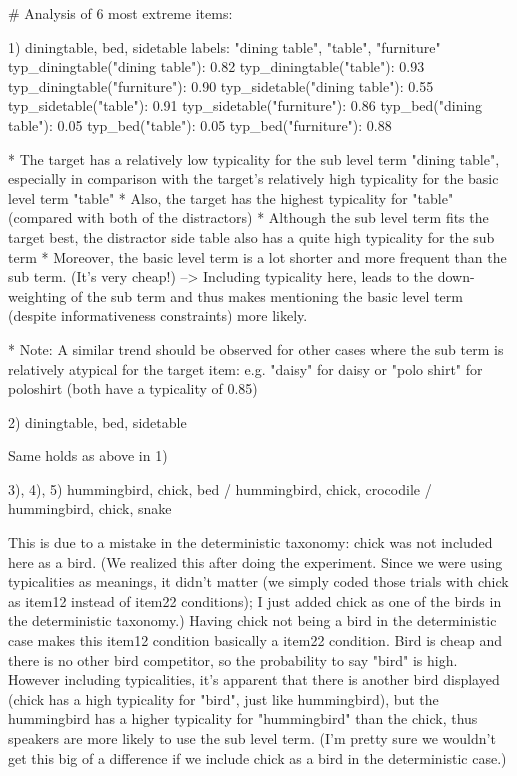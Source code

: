 # Analysis of 6 most extreme items:

1) diningtable, bed, sidetable
	labels: "dining table", "table", "furniture"
	typ_diningtable("dining table"): 0.82
	typ_diningtable("table"): 0.93
	typ_diningtable("furniture"): 0.90
	typ_sidetable("dining table"): 0.55
	typ_sidetable("table"): 0.91
	typ_sidetable("furniture"): 0.86
	typ_bed("dining table"): 0.05
	typ_bed("table"): 0.05
	typ_bed("furniture"): 0.88

	* The target has a relatively low typicality for the sub level term "dining table", especially in comparison with the target's relatively high typicality for the basic level term "table" 
	* Also, the target has the highest typicality for "table" (compared with both of the distractors)
	* Although the sub level term fits the target best, the distractor side table also has a quite high typicality for the sub term 	* Moreover, the basic level term is a lot shorter and more frequent than the sub term. (It's very cheap!)
	--> Including typicality here, leads to the down-weighting of the sub term and thus makes mentioning the basic level term (despite informativeness constraints) more likely.

	* Note: A similar trend should be observed for other cases where the sub term is relatively atypical for the target item: e.g. "daisy" for daisy or "polo shirt" for poloshirt (both have a typicality of 0.85)

2) diningtable, bed, sidetable

	Same holds as above in 1)

3), 4), 5) hummingbird, chick, bed / hummingbird, chick, crocodile / hummingbird, chick, snake

	This is due to a mistake in the deterministic taxonomy: chick was not included here as a bird. (We realized this after doing the experiment. Since we were using typicalities as meanings, it didn't matter (we simply coded those trials with chick as item12 instead of item22 conditions); I just added chick as one of the birds in the deterministic taxonomy.) 
	Having chick not being a bird in the deterministic case makes this item12 condition basically a item22 condition. Bird is cheap and there is no other bird competitor, so the probability to say "bird" is high.
	However including typicalities, it's apparent that there is another bird displayed (chick has a high typicality for "bird", just like hummingbird), but the hummingbird has a higher typicality for "hummingbird" than the chick, thus speakers are more likely to use the sub level term.
	(I'm pretty sure we wouldn't get this big of a difference if we include chick as a bird in the deterministic case.)

